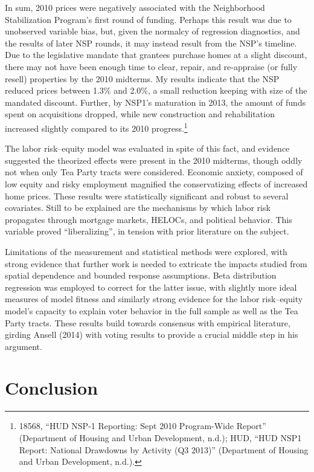 \documentclass[12pt,oneside]{psthesis}
\begin{document}
In sum, 2010 prices were negatively associated with the Neighborhood Stabilization Program's first round of funding.
Perhaps this result was due to unobserved variable bias, but, given the normalcy of regression diagnostics, and the results of later NSP rounds, it may instead result from the NSP's timeline.
Due to the legislative mandate that grantees purchase homes at a slight discount, there may not have been enough time to clear, repair, and re-appraise (or fully resell) properties by the 2010 midterms.
My results indicate that the NSP reduced prices between 1.3\% and 2.0\%, a small reduction keeping with size of the mandated discount.
Further, by NSP1's maturation in 2013, the amount of funds spent on acquisitions dropped, while new construction and rehabilitation increased slightly compared to its 2010 progress.\footnote{18568, ``HUD NSP-1 Reporting: Sept 2010 Program-Wide Report'' (Department of Housing and Urban Development, n.d.); HUD, ``HUD NSP1 Report: National Drawdowns by Activity (Q3 2013)'' (Department of Housing and Urban Development, n.d.).}

The labor risk--equity model was evaluated in spite of this fact, and evidence suggested the theorized effects were present in the 2010 midterms, though oddly not when only Tea Party tracts were considered.
Economic anxiety, composed of low equity and risky employment magnified the conservatizing effects of increased home prices.
These results were statistically significant and robust to several covariates.
Still to be explained are the mechanisms by which labor risk propagates through mortgage markets, HELOCs, and political behavior.
This variable proved ``liberalizing'', in tension with prior literature on the subject.

Limitations of the measurement and statistical methods were explored, with strong evidence that further work is needed to extricate the impacts studied from spatial dependence and bounded response assumptions.
Beta distribution regression was employed to correct for the latter issue, with slightly more ideal measures of model fitness and similarly strong evidence for the labor risk--equity model's capacity to explain voter behavior in the full sample as well as the Tea Party tracts.
These results build towards consensus with empirical literature, girding Ansell (2014) with voting results to provide a crucial middle step in his argument.

\hypertarget{conclusion}{%
\chapter{Conclusion}\label{conclusion}}
\end{document}
